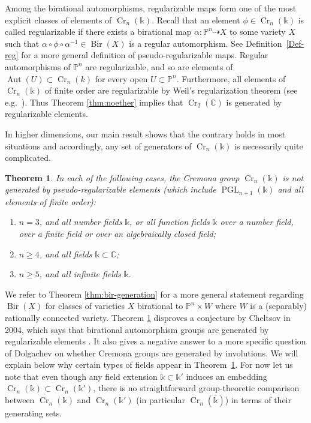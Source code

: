 \documentclass[a4paper,12pt]{amsart}
\def\C{\mathbb C}
\def\k{\mathbb k}
\def\P{\mathbb P}
\def\PGL{{\operatorname{PGL}}}
\def\Aut{{\operatorname{Aut}}}
\def\Bir{{\operatorname{Bir}}}
\def\Cr{{\operatorname{Cr}}}
\def\ol{\overline}
\theoremstyle{plain}
\newtheorem{theorem}[dummy]{Theorem}
\numberwithin{equation}{section}
\theoremstyle{definition}
\renewcommand{\(}{\left(}
\renewcommand{\)}{\right)}
\begin{document}
Among the birational automorphisms,
regularizable maps form 
one of the most explicit classes
of elements of $\Cr_n(\k)$.
Recall that an element $\phi \in \Cr_n(\k)$
is called regularizable
if there exists a birational map 
$\alpha: \P^n \dashrightarrow X$
to some variety $X$ 
such that $\alpha \circ \phi \circ \alpha^{-1} \in \Bir(X)$ is a regular automorphism.
See Definition~\ref{Def-reg} for 
a more general definition of 
pseudo-regularizable maps. 
Regular automorphisms of $\P^n$ are regularizable,
and so are elements of $\Aut(U) \subset \Cr_n(k)$
for every open $U \subset \P^n$.
Furthermore, all
elements of $\Cr_n(\k)$ of
finite order are regularizable
by Weil's regularization theorem (see e.g.~\cite[Theorem 1.7]{CheltsovCremona}).
Thus Theorem \ref{thm:noether} implies that $\Cr_2(\C)$
is generated by regularizable elements. 


In higher dimensions, our main result shows that
the contrary holds in most situations and accordingly, 
any set of generators
of $\Cr_n(\k)$
is necessarily quite complicated.

 


\begin{theorem}\label{thm:main}
In each of
the following cases,
the Cremona group
$\Cr_n(\k)$ is not generated by pseudo-regularizable elements
\textup(which include $\PGL_{n+1}(\k)$
and all 
elements of finite order\textup):
\begin{enumerate}
    \item $n = 3$, and all number fields $\k$, or all function fields $\k$ 
    over a number field, over a finite field or over an algebraically closed field; 
    \item $n \ge 4$, and all fields $\k \subset \C$;
    \item $n \ge 5$, and all infinite fields $\k$.
\end{enumerate}
\end{theorem}



We refer to Theorem \ref{thm:bir-generation} for a more general statement regarding $\Bir(X)$
for classes of varieties $X$ birational to 
$\P^n \times W$ where $W$ is a (separably)
rationally connected variety.
Theorem \ref{thm:main}
disproves a conjecture by Cheltsov in 2004,
which says that 
birational automorphism groups are generated by regularizable
elements \cite[Conjecture 1.12]{CheltsovCremona}.
It also
gives a negative answer to
a more specific
question of Dolgachev \cite[Question on p.1]{Deserti} on whether Cremona groups
are generated by involutions.
We will explain below why certain
types of fields appear in Theorem~\ref{thm:main}.
For now let us note that even though
any field extension $\k \subset \k'$
induces
an embedding $\Cr_n(\k) \subset \Cr_n(\k')$,
there is no straightforward group-theoretic comparison
between $\Cr_n(\k)$ and 
$\Cr_n(\k')$ (in particular $\Cr_n(\ol{\k})$) in
terms of their generating sets.
\end{document}
